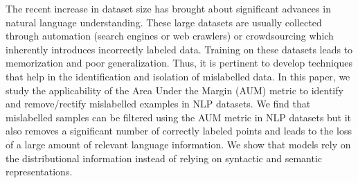 The recent increase in dataset size has brought about significant advances in natural language understanding. These large datasets are usually collected through automation (search engines or web crawlers) or crowdsourcing which inherently introduces incorrectly labeled data. Training on these datasets leads to memorization and poor generalization. Thus, it is pertinent to develop techniques that help in the identification and isolation of mislabelled data. In this paper, we study the applicability of the Area Under the Margin (AUM) metric to identify and remove/rectify mislabelled examples in NLP datasets. We find that mislabelled samples can be filtered using the AUM metric in NLP datasets but it also removes a significant number of correctly labeled points and leads to the loss of a large amount of relevant language information. We show that models rely on the distributional information instead of relying on syntactic and semantic representations.
